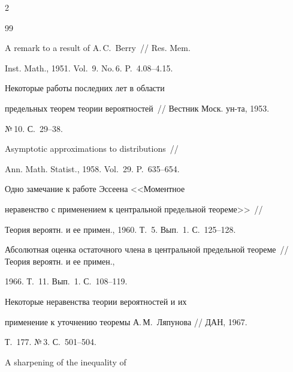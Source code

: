 \begin{multicols}{2}
{{\begin{thebibliography}{99}


 A remark to a result of A.\,C.~Berry~// Res. Mem.


Inst. Math., 1951. Vol.~9. No.\,6. P.~4.08--4.15.







 Некоторые работы последних лет в области


предельных теорем теории вероятностей~// Вестник Моск. ун-та, 1953.


№\,10. С.~29--38.







 Asymptotic approximations to distributions~//


Ann. Math. Statist., 1958. Vol.~29. P.~635--654.







 Одно замечание к работе Эссеена <<Моментное


неравенство с применением к центральной предельной теореме>>~//


Теория вероятн. и ее примен., 1960. Т.~5. Вып.~1. С.~125--128.









Абсолютная оценка остаточного члена в центральной предельной теореме~// Теория вероятн. и ее примен.,


1966. Т.~11. Вып.~1. С.~108--119.







 Некоторые неравенства теории вероятностей и их


применение к уточнению теоремы А.\,М.~Ляпунова // ДАН, 1967.


Т.~177. №\,3. С.~501--504.







 A sharpening of the inequality of



\end{thebibliography}}}
\end{multicols}
